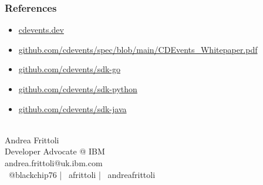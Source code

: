 \documentclass[aspectratio=169,11pt,hyperref={colorlinks=true}]{beamer}
\begin{document}
\begin{blackframe}
  \frametitle{References}
  \begin{itemize}
    \item \href{https://cdevents.dev}{cdevents.dev}
    \item \href{https://github.com/cdevents/spec/blob/main/CDEvents_Whitepaper.pdf}{github.com/cdevents/spec/blob/main/CDEvents\_Whitepaper.pdf}
    \item \href{https://github.com/cdevents/sdk-go}{github.com/cdevents/sdk-go}
    \item \href{https://github.com/cdevents/sdk-python}{github.com/cdevents/sdk-python}
    \item \href{https://github.com/cdevents/sdk-java}{github.com/cdevents/sdk-java}
  \end{itemize}
  ~ \\
  Andrea Frittoli \\
  Developer Advocate @ IBM\\
  andrea.frittoli@uk.ibm.com \\
  \faTwitter ~@blackchip76 | \faGithub ~afrittoli | \faLinkedin ~andreafrittoli
\end{blackframe}
\end{document}
